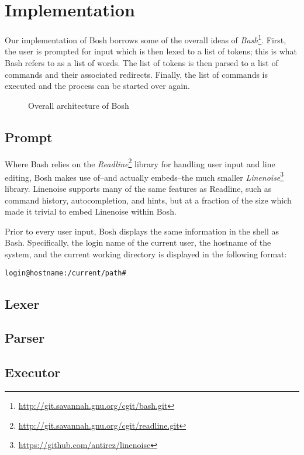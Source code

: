 \section{Implementation}
\label{sec:implementation}

Our implementation of Bosh borrows some of the overall ideas of \textit{Bash}\footnote{\url{http://git.savannah.gnu.org/cgit/bash.git}}. First, the user is prompted for input which is then lexed to a list of tokens; this is what Bash refers to as a list of words. The list of tokens is then parsed to a list of commands and their associated redirects. Finally, the list of commands is executed and the process can be started over again.

\begin{figure}[ht]
  \centering

  \caption{Overall architecture of Bosh}
  \label{fig:architecture}
\end{figure}

\subsection{Prompt}

Where Bash relies on the \textit{Readline}\footnote{\url{http://git.savannah.gnu.org/cgit/readline.git}} library for handling user input and line editing, Bosh makes use of--and actually embeds--the much smaller \textit{Linenoise}\footnote{\url{https://github.com/antirez/linenoise}} library. Linenoise supports many of the same features as Readline, such as command history, autocompletion, and hints, but at a fraction of the size which made it trivial to embed Linenoise within Bosh.

Prior to every user input, Bosh displays the same information in the shell as Bash. Specifically, the login name of the current user, the hostname of the system, and the current working directory is displayed in the following format:

\begin{lstlisting}
login@hostname:/current/path#
\end{lstlisting}

\subsection{Lexer}

\subsection{Parser}

\subsection{Executor}
